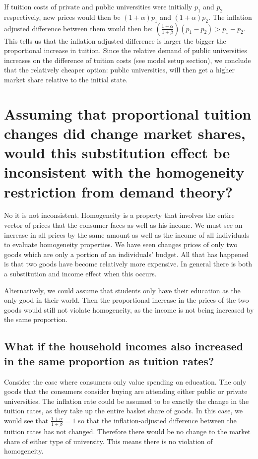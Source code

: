 \documentclass[12pt]{paper}
\begin{document}
If tuition costs of private and public universities were initially
$p_1$ and $p_2$ respectively, new prices would then be
$(1+\alpha) p_1$ and $(1+\alpha) p_2$. The inflation adjusted difference between
them would then be:
$ \left (\frac{1+\alpha}{1+\beta} \right ) ( p _1 - p_2 ) > p_1 - p_2$. This
tells us that the inflation adjusted difference is larger the bigger
the proportional increase in tuition. Since the relative demand of
public universities increases on the difference of tuition costs (see
model setup section), we conclude that the relatively cheaper option:
public universities, will then get a higher market share relative to
the initial state.


\section{Assuming that proportional tuition changes did change market
  shares, would this substitution effect be inconsistent with the
  homogeneity restriction from demand theory? }

No it is not inconsistent. Homogeneity is a property that involves the
entire vector of prices that the consumer faces as well as his
income. We must see an increase in all prices by the same amount as
well as the income of all individuals to evaluate homogeneity
properties. We have seen changes prices of only two goods which are
only a portion of an individuals' budget.  All that has happened is
that two goods have become relatively more expensive. In general there
is both a substitution and income effect when this occurs.

Alternatively, we could assume that students only have their education as the
only good in their world. Then the proportional increase in the
prices of the two goods would still not violate homogeneity, as
the income is not being increased by the same proportion.

\subsection{What if the household
  incomes also increased in the same proportion as tuition rates?}

Consider the case where consumers only value spending on
education. The only goods that the consumers consider buying are
attending either public or private universities. The inflation rate
could be assumed to be exactly the change in the tuition rates, as
they take up the entire basket share of goods. In this case, we would
see that $\frac{1+\alpha}{1+\beta} = 1$ so that the inflation-adjusted
difference between the tuition rates has not changed. Therefore there
would be no change to the market share of either type of
university. This means there is no violation of homogeneity.
\end{document}
